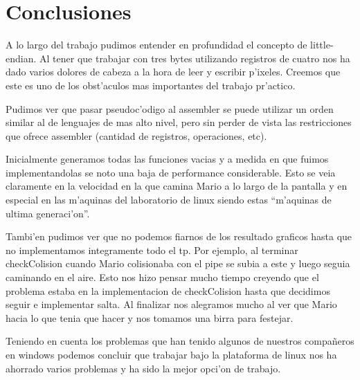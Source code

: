 \section{Conclusiones}
A lo largo del trabajo pudimos entender en profundidad el concepto de little-endian. Al tener que trabajar con tres bytes utilizando registros de cuatro nos ha dado varios dolores de cabeza a la hora de leer y escribir p'ixeles. 
Creemos que este es uno de los obst'aculos mas importantes del trabajo pr'actico.

Pudimos ver que pasar pseudoc'odigo al assembler se puede utilizar un orden similar al de lenguajes de mas alto nivel, pero sin perder de vista las restricciones que ofrece assembler (cantidad de registros, operaciones, etc).

Inicialmente generamos todas las funciones vacias y a medida en que fuimos implementandolas se noto una baja de performance considerable. Esto se veia claramente en la velocidad en la que camina Mario a lo largo de la pantalla y en especial en las m'aquinas del laboratorio de linux siendo estas ``m'aquinas de ultima generaci'on''.

Tambi'en pudimos ver que no podemos fiarnos de los resultado graficos hasta que no implementamos integramente todo el tp. Por ejemplo, al terminar checkColision cuando Mario colisionaba con el pipe se subia a este y luego seguia caminando en el aire. Esto nos hizo pensar mucho tiempo creyendo que el problema estaba en la implementacion de checkColision hasta que decidimos seguir e implementar salta. Al finalizar nos alegramos mucho al ver que Mario hacia lo que tenia que hacer y nos tomamos una birra para festejar.

Teniendo en cuenta los problemas que han tenido algunos de nuestros compañeros en windows podemos concluir que trabajar bajo la plataforma de linux nos ha ahorrado varios problemas y ha sido la mejor opci'on de trabajo.


